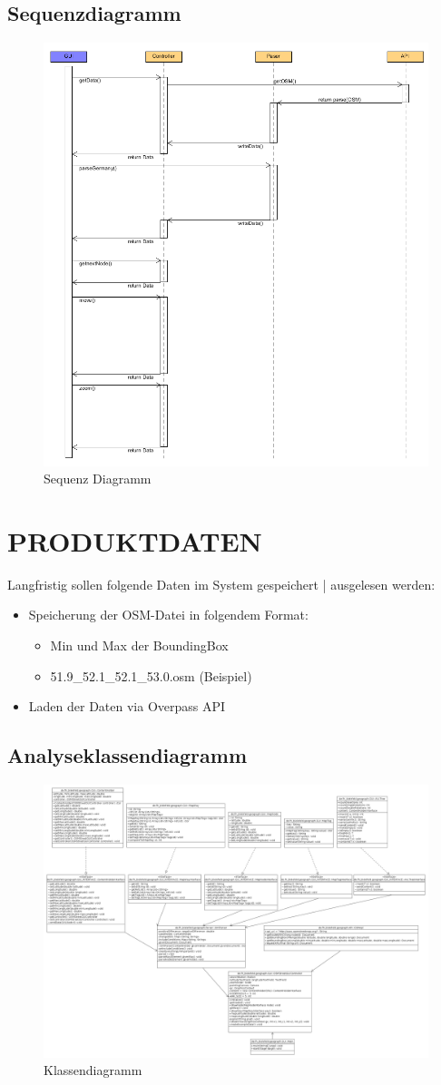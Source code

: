 	\subsection{Sequenzdiagramm}
	\begin{figure}[H]
	\centering
	\includegraphics[width=0.7\linewidth]{images/Squenz}
	\caption{Sequenz Diagramm}
	\label{fig:Sequenz Diagramm}
	\end{figure}
	
\newpage
	\section{\Large PRODUKTDATEN}
		Langfristig sollen folgende Daten im System gespeichert | ausgelesen werden:
	\begin{itemize}
		\item Speicherung der OSM-Datei in folgendem Format: 
		\begin{itemize}
			\item Min und Max der BoundingBox
			\item 51.9\_52.1\_52.1\_53.0.osm (Beispiel)
		\end{itemize}
		\item Laden der Daten via Overpass API
	\end{itemize}
	\subsection{Analyseklassendiagramm}	
		\begin{figure}[H]
		\centering
		\includegraphics[width=0.7\linewidth]{images/Klassendiagramm}
		\caption{Klassendiagramm}
		\label{fig:Klassendiagramm}
	\end{figure}
